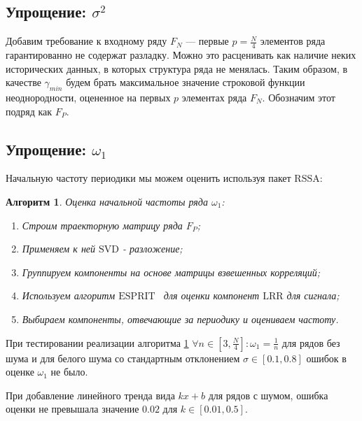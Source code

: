 \documentclass[specialist, substylefile = spbu.rtx,
			   subf, href, 12pt]{disser}
\newtheorem{algorithm}{Алгоритм}
\begin{document}
\subsection{Упрощение: $ \sigma^2 $}
Добавим требование к входному ряду $ F_N $ --- первые $ p = \frac{N}{4} $ элементов ряда гарантированно не содержат разладку. Можно это расценивать как наличие неких исторических данных, в которых структура ряда не менялась. Таким образом, в качестве $ \gamma_{min} $ будем брать максимальное значение строковой функции неоднородности, оцененное на первых $ p $ элементах ряда $ F_N $. Обозначим этот подряд как $ F_P $.

\subsection{Упрощение: $ \omega_1 $}
Начальную частоту периодики мы можем оценить используя пакет $ \mathrm{RSSA} $:
\begin{algorithm}\label{algo:estimate_omega_1}
	Оценка начальной частоты ряда $ \omega_1 $:
	\begin{enumerate}
		\item Строим траекторную матрицу ряда $ F_P $;
		\item Применяем к ней $ \mathrm{SVD} $ - разложение;
		\item Группируем компоненты на основе матрицы взвешенных корреляций;
		\item Используем алгоритм $ \mathrm{ESPRIT} $~\cite{epsrit} для оценки компонент $ \mathrm{LRR} $ для сигнала;
		\item Выбираем компоненты, отвечающие за периодику и оцениваем частоту.	
	\end{enumerate}
\end{algorithm}

При тестировании реализации алгоритма \ref{algo:estimate_omega_1} $ \forall n \in [3, \frac{N}{4}]: \omega_1 = \frac{1}{n}$ для рядов без шума и для белого шума со стандартным отклонением $ \sigma \in [0.1, 0.8] $ ошибок в оценке $ \omega_1 $ не было. 

При добавление линейного тренда вида $ kx + b $ для рядов с шумом, ошибка оценки не превышала значение $ 0.02 $ для $ k \in [0.01, 0.5] $.
\end{document}
